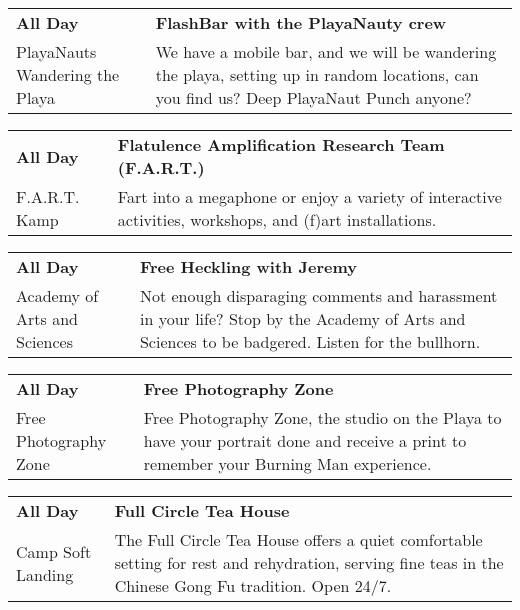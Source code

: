 \begin{tabular}{ p{1in} p{2.2in} }
    \textbf{All Day} & \textbf{FlashBar with the PlayaNauty crew} \\
    PlayaNauts \newline Wandering the Playa & We have a mobile bar, and we will be wandering the playa, setting up in random locations, can you find us?
Deep PlayaNaut Punch anyone? \\
    \hline 
\end{tabular}
    
\begin{tabular}{ p{1in} p{2.2in} }
    \textbf{All Day} & \textbf{Flatulence Amplification Research Team (F.A.R.T.) } \\
    F.A.R.T. Kamp \newline  & Fart into a megaphone or enjoy a variety of interactive activities, workshops, and (f)art installations. \\
    \hline 
\end{tabular}
    
\begin{tabular}{ p{1in} p{2.2in} }
    \textbf{All Day} & \textbf{Free Heckling with Jeremy} \\
    Academy of Arts and Sciences \newline  & Not enough disparaging comments and harassment in your life?  Stop by the Academy of Arts and Sciences to be badgered.  Listen for the bullhorn. \\
    \hline 
\end{tabular}
    
\begin{tabular}{ p{1in} p{2.2in} }
    \textbf{All Day} & \textbf{Free Photography Zone} \\
    Free Photography Zone \newline  & Free Photography Zone, the studio on the Playa to have your portrait done and receive a print to remember your Burning Man experience. \\
    \hline 
\end{tabular}
    
\begin{tabular}{ p{1in} p{2.2in} }
    \textbf{All Day} & \textbf{Full Circle Tea House} \\
    Camp Soft Landing \newline  & The Full Circle Tea House offers a quiet comfortable setting for rest and rehydration, serving fine teas in the Chinese Gong Fu tradition. Open 24/7. \\
    \hline 
\end{tabular}
    
